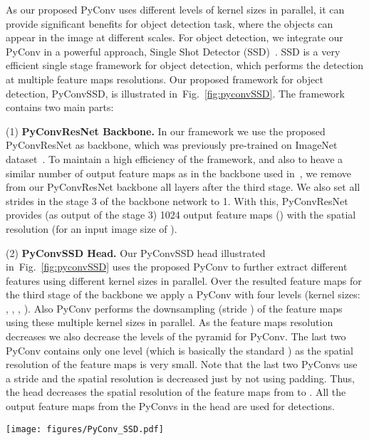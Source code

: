 \documentclass{article}
\begin{document}
As our proposed PyConv uses different levels of kernel sizes in parallel, it can provide significant benefits for object detection task, where the objects can appear in the image at different scales.  For object detection, we integrate our PyConv in a powerful approach, Single Shot Detector (SSD)~\cite{liu2016ssd}. SSD is a very efficient single stage framework for object detection, which performs the detection at multiple feature maps resolutions. Our proposed framework for object detection, PyConvSSD,  is illustrated in~Fig.~\ref{fig:pyconvSSD}. The framework contains two main parts:

(1) {\bf PyConvResNet Backbone.} In our framework we use the proposed PyConvResNet as backbone, which was previously pre-trained on ImageNet dataset~\cite{russakovsky2015imagenet}. To maintain a high efficiency of the framework, and also to heave a similar number of output feature maps as in the backbone used in~\cite{liu2016ssd}, we remove from our PyConvResNet backbone all layers after the third stage. We also set all strides in the stage 3 of the backbone network to 1. With this, PyConvResNet  provides (as output of the  stage 3) 1024 output feature maps () with the spatial resolution  (for an input image size of ).

(2) {\bf PyConvSSD Head.} Our PyConvSSD head illustrated in~Fig.~\ref{fig:pyconvSSD} uses the proposed PyConv to further extract different features using  different kernel sizes in parallel. Over the resulted  feature maps for the third stage of the backbone we apply a PyConv with four levels (kernel sizes: , , , ). Also PyConv performs the downsampling (stride ) of the feature maps using these multiple kernel sizes in parallel. As the feature maps resolution decreases we also decrease the levels of the pyramid for PyConv. The last two PyConv contains only one level (which is basically the standard ) as the spatial resolution of the feature maps is very small. Note that the  last two PyConvs use a stride  and the spatial resolution is decreased just by not using padding. Thus, the head decreases the spatial resolution of the feature maps from  to . All the output feature maps from the PyConvs in the head are used for detections. 


\begin{figure*}[t]\centering
  \texttt{[image: figures/PyConv\_SSD.pdf]}
  \caption{PyConvSSD framework for object detection.}
  \label{fig:pyconvSSD}
\end{figure*}
\end{document}
